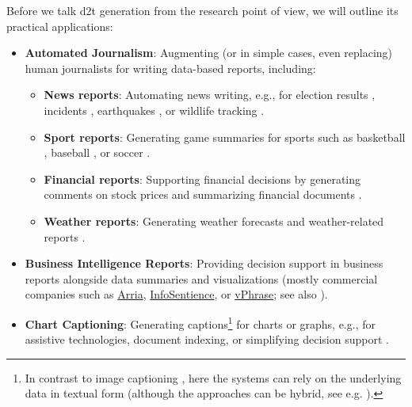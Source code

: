 {Before we talk \ac{d2t} generation from the research point of view, we will outline its practical applications:

\begin{itemize}
    \item \textbf{Automated Journalism}: Augmenting (or in simple cases, even replacing) human journalists for writing data-based reports, including:
          \begin{itemize}
              \item \textbf{News reports}: Automating news writing, e.g., for election results \cite{leppanen2017data}, incidents \cite{vanderleeCACAPODatasetMultilingual2020}, earthquakes \cite{oremus2014first}, or wildlife tracking \cite{siddharthan2012blogging,ponnamperuma2013tag2blog}.
              \item \textbf{Sport reports}: Generating game summaries for sports such as basketball \cite{wiseman2017challenges,thomson2020sportsett}, baseball \cite{puduppullyDatatotextGenerationEntity2019}, or soccer \cite{van2017pass}.
              \item \textbf{Financial reports}: Supporting financial decisions by generating comments on stock prices \cite{murakami2017learning,aoki2018generating} and summarizing financial documents \cite{chapman2022towards}.
              \item \textbf{Weather reports}: Generating weather forecasts and weather-related reports \cite{goldberg1994using,belz2005corpus,belz2008automatic,angeli-etal-2010-simple,balakrishnan2019constrained}.
          \end{itemize}
    \item \textbf{Business Intelligence Reports}: Providing decision support in business reports alongside data summaries and visualizations (mostly commercial companies such as \href{https://www.arria.com}{Arria}, \href{https://infosentience.com}{InfoSentience}, or \href{https://www.vphrase.com}{vPhrase}; see also \citealp{perlitz2023nbiig}).
    \item \textbf{Chart Captioning}: Generating captions\footnote{In contrast to image captioning \cite{stefanini2022show}, here the systems can rely on the underlying data in textual form (although the approaches can be hybrid, see e.g. \citealp{kantharajCharttoTextLargeScaleBenchmark2022}).} for charts or graphs, e.g., for assistive technologies, document indexing, or simplifying decision support \cite{demirGeneratingTextualSummaries2008,demirSummarizingInformationGraphics2012,obeidCharttoTextGeneratingNatural2020,kantharajCharttoTextLargeScaleBenchmark2022}.

\end{itemize}}
